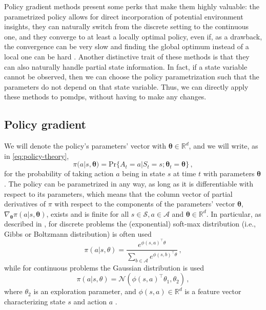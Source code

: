 Policy gradient methods present some perks that make them highly valuable: the parametrized policy allows for direct incorporation of potential environment insights, they can naturally switch from the discrete setting to the continuous one, and they converge to at least a locally optimal policy, even if, as a drawback, the convergence can be very slow and finding the global optimum instead of a local one can be hard \cite{Peters2010}. Another distinctive trait of these methods is that they can also naturally handle partial state information. In fact, if a state variable cannot be observed, then we can choose the policy parametrization such that the parameters do not depend on that state variable. Thus, we can directly apply these methods to \acrshort{pomdp}s, without having to make any changes.


\subsection{Policy gradient}
\label{sec:pg}

We will denote the policy's parameters' vector with $\boldsymbol \theta \in \mathbb R^{d}$, and we will write, as in \eqref{eq:policy-theory},
\begin{equation}
    \pi(a|s,\boldsymbol \theta) = \text{Pr}\{A_t = a | S_t = s; \boldsymbol \theta_t = \boldsymbol {\theta}\} \, ,
    \label{eq:policy-with-parameters}
\end{equation}
for the probability of taking action $a$ being in state $s$ at time $t$ with parameters $\boldsymbol \theta$ \cite{SuttonBarto}. The policy can be parametrized in any way, as long as it is differentiable with respect to its parameters, which means that the column vector of partial derivatives of $\pi$ with respect to the components of the parameters' vector $\boldsymbol \theta$, $\nabla_{\boldsymbol \theta} \pi (a|s,\boldsymbol \theta)$, exists and is finite for all $s \in \mathcal S, a \in \mathcal A$ and $\boldsymbol \theta \in \mathbb R^{d}$. In particular, as described in \cite{Peters2010}, for discrete problems the (exponential) soft-max distribution (i.e., Gibbs or Boltzmann distribution) is often used
\begin{equation}
    \pi(a|s, \theta) = \frac{e^{\phi(s,a)^\top \theta}}{\sum_{b \in \mathcal A} e^{\phi(s,b)^\top \theta}} \, ,
    \label{eq:pi-boltzmann}
\end{equation}
while for continuous problems the Gaussian distribution is used
\begin{equation}
    \pi(a|s, \theta) = \mathcal N(\phi(s,a)^\top \theta_1, \theta_2) \, ,
\end{equation}
where $\theta_2$ is an exploration parameter, and $\phi(s,a) \in \mathbb R^{d}$ is a feature vector characterizing state $s$ and action $a$ \cite{Sutton2000}.

